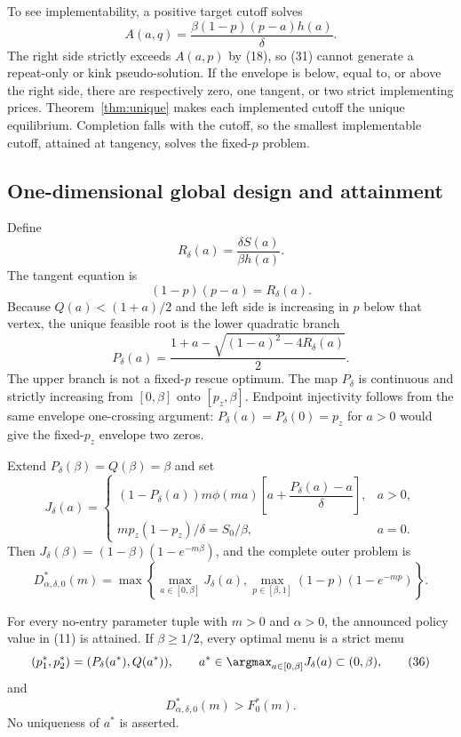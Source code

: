 \documentclass[mnsc,dblanonrev]{informs4}
\newcommand{\ph}{\phi}
\begin{document}
To see implementability, a positive target cutoff solves
\[
 A(a,q)=\frac{\beta(1-p)(p-a)h(a)}\delta.                  \tag{31}
\]
The right side strictly exceeds $A(a,p)$ by (18), so (31) cannot generate a
repeat-only or kink pseudo-solution.  If the envelope is below, equal to, or
above the right side, there are respectively zero, one tangent, or two strict
implementing prices.  Theorem~\ref{thm:unique} makes each implemented cutoff
the unique equilibrium.  Completion falls with the cutoff, so the smallest
implementable cutoff, attained at tangency, solves the fixed-$p$ problem.

\subsection{One-dimensional global design and attainment}

Define
\[
 R_\delta(a)=\frac{\delta S(a)}{\beta h(a)}.
\]
The tangent equation is
\[
 (1-p)(p-a)=R_\delta(a).                                     \tag{32}
\]
Because $Q(a)<(1+a)/2$ and the left side is increasing in $p$ below that
vertex, the unique feasible root is the lower quadratic branch
\[
 P_\delta(a)=
 \frac{1+a-\sqrt{(1-a)^2-4R_\delta(a)}}2.                  \tag{33}
\]
The upper branch is not a fixed-$p$ rescue optimum.  The map $P_\delta$ is
continuous and strictly increasing from $[0,\beta]$ onto $[p_z,\beta]$.
Endpoint injectivity follows from the same envelope one-crossing argument:
$P_\delta(a)=P_\delta(0)=p_z$ for $a>0$ would give the fixed-$p_z$
envelope two zeros.

Extend $P_\delta(\beta)=Q(\beta)=\beta$ and set
\[
 J_\delta(a)=
 \begin{cases}
 (1-P_\delta(a))m\ph(ma)
 \left[a+\dfrac{P_\delta(a)-a}\delta\right],&a>0,\\[6pt]
 mp_z(1-p_z)/\delta=S_0/\beta,&a=0.
 \end{cases}                                                \tag{34}
\]
Then $J_\delta(\beta)=(1-\beta)(1-e^{-m\beta})$, and the complete outer
problem is
\[
 D_{\alpha,\delta,0}^*(m)=
 \max\left\{
 \max_{a\in[0,\beta]}J_\delta(a),
 \max_{p\in[\beta,1]}(1-p)(1-e^{-mp})
 \right\}.                                                  \tag{35}
\]

\begin{theorem}
\label{thm:global}
For every no-entry parameter tuple with $m>0$ and $\alpha>0$, the announced
policy value in (11) is attained.  If $\beta\ge1/2$, every optimal menu is a
strict menu
\[
 (p_1^*,p_2^*)=(P_\delta(a^*),Q(a^*)),
 \qquad a^*\in\argmax_{a\in[0,\beta]}J_\delta(a)
 \subset(0,\beta),                                          \tag{36}
\]
and
\[
 D_{\alpha,\delta,0}^*(m)>F_0^*(m).                         \tag{37}
\]
No uniqueness of $a^*$ is asserted.
\end{theorem}
\end{document}
